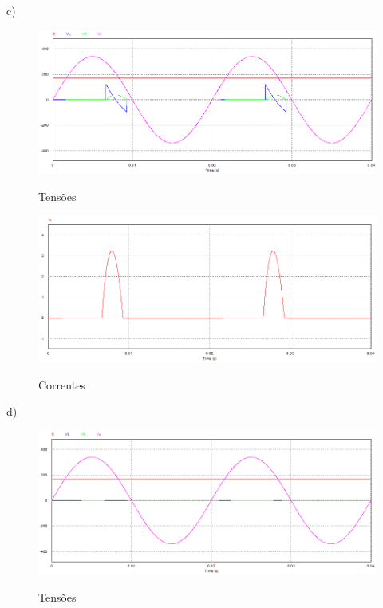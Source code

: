 \documentclass[titlepage, a4paper, 11pt, reqno, openany]{report}
\begin{document}
\begin{enumerate}
%
c)\par
%
\begin{figure}[H]
\centering
\includegraphics[width=0.90\linewidth]{./image/P2A2p3c_1.png}\\
\caption{Tens\~{o}es}
\label{grafico 23}
\end{figure}\par
%
\begin{figure}[H]
\centering
\includegraphics[width=0.90\linewidth]{./image/P2A2p3c_2.png}\\
\caption{Correntes}
\label{grafico 24}
\end{figure}\par
%
d)\par
%
\begin{figure}[H]
\centering
\includegraphics[width=0.90\linewidth]{./image/P2A2p3d_1.png}\\
\caption{Tens\~{o}es}
\label{grafico 25}
\end{figure}\par
%
\begin{figure}[H]

\end{figure}
\end{enumerate}
\end{document}
